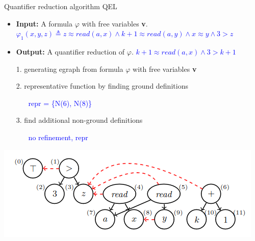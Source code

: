 \documentclass{beamer}
\begin{document}
\begin{frame}{Quantifier reduction algorithm QEL}

\begin{center}
\begin{itemize}
    \item \textbf{Input:} A formula $\varphi$ with free variables \textbf{v}. 
    \textcolor{blue}{$\varphi_1 (x,y,z) \triangleq z \approx read(a,x) \land k + 1 \approx read(a,y) \land x \approx y \land 3 > z$}
    \item \textbf{Output:} A quantifier reduction of $\varphi$.
    \textcolor{blue}{$k+1 \approx read(a,x) \land 3 > k+1$}
    \item[1.] generating egraph from formula $\varphi$ with free variables
    \textbf{v}
    \item[2.] representative function by finding ground definitions
    \begin{itemize}
        \item[] \textcolor{blue}{repr = \{N(6), N(8)\}}
    \end{itemize}
    \item[3.] find additional non-ground definitions
    \begin{itemize}
        \item[] \textcolor{blue}{no refinement, repr}
    \end{itemize}
\end{itemize}
\end{center}
\begin{center}
\includegraphics[scale=0.4]{FMI1.png}
\end{center}

\end{frame}
\end{document}
